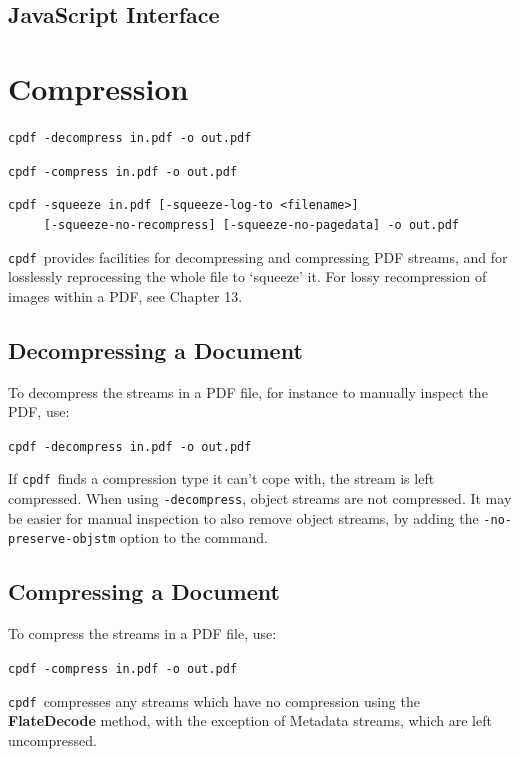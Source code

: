 \documentclass{book}
\newcommand{\cpdf}{\texttt{cpdf}}
\begin{document}
\begin{jscpdflib}
\clearpage
\section*{JavaScript Interface}
\begin{small}\tt

\end{small}
\end{jscpdflib}

\chapter{Compression}\label{chap:5}
  \begin{framed}
     \small\noindent\verb!cpdf -decompress in.pdf -o out.pdf!

     \vspace{1.5mm}
     \noindent\verb!cpdf -compress in.pdf -o out.pdf!
     
     \vspace{1.5mm}
     \noindent\verb!cpdf -squeeze in.pdf [-squeeze-log-to <filename>]!\\
     \noindent\verb!     [-squeeze-no-recompress] [-squeeze-no-pagedata] -o out.pdf!   
   \end{framed}
  \cpdf\ provides facilities for decompressing and compressing PDF streams, and for losslessly reprocessing the whole file to `squeeze' it. For lossy recompression of images within a PDF, see Chapter 13.
  \section{Decompressing a Document}
  To decompress the streams in a PDF file, for instance to manually inspect the
PDF, use:
  \begin{framed}
   \noindent\small\verb!cpdf -decompress in.pdf -o out.pdf!
  \end{framed}
  \noindent If \cpdf\ finds a compression type it can't cope with, the stream is left compressed. When using \texttt{-decompress}, object streams are not compressed. It may be easier for manual inspection to also remove object streams, by adding the \texttt{-no-preserve-objstm} option to the command.
  \section{Compressing a Document}
  To compress the streams in a PDF file, use:
  \begin{framed}
    \noindent\small\verb!cpdf -compress in.pdf -o out.pdf!
  \end{framed}
  \noindent\cpdf\ compresses any streams which have no compression using the
  \textbf{Flate\-Decode} method, with the exception of Metadata streams, which
  are left uncompressed.
  
\end{document}

